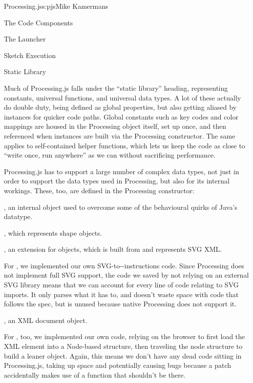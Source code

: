 \begin{aosachapter}{Processing.js}{s:pjs}{Mike Kamermans}
\begin{aosasect1}{The Code Components}
\begin{aosasect2}{The Launcher}
\begin{aosasect3}{Sketch Execution}
\end{aosasect3}

\end{aosasect2}

\begin{aosasect2}{Static Library}

Much of Processing.js falls under the ``static library'' heading,
representing constants, universal functions, and universal data
types. A lot of these actually do double duty, being defined as global
properties, but also getting aliased by instances for quicker code
paths. Global constants such as key codes and color mappings are
housed in the Processing object itself, set up once, and then
referenced when instances are built via the Processing
constructor. The same applies to self-contained helper functions,
which lets us keep the code as close to ``write once, run anywhere'' as
we can without sacrificing performance.

Processing.js has to support a large number of complex data types, not
just in order to support the data types used in Processing, but also
for its internal workings. These, too, are defined in the Processing
constructor:

\begin{aosadescription}

\item{}, an internal object used to overcome some of the
  behavioural quirks of Java's  datatype.

\item{}, which represents shape objects.

\item{}, an extension for  objects, which is built from and
  represents SVG XML.

For , we implemented our own
SVG-to--instructions code. Since
Processing does not implement full SVG support, the code we saved by
not relying on an external SVG library means that we can account for
every line of code relating to SVG imports. It only parses what it has
to, and doesn't waste space with code that follows the spec, but is
unused because native Processing does not support it.

\item{}, an XML document object.

For , too, we implemented our own code, relying on the
browser to first load the XML element into a Node-based structure,
then traveling the node structure to build a leaner object. Again,
this means we don't have any dead code sitting in Processing.js,
taking up space and potentially causing bugs because a patch
accidentally makes use of a function that shouldn't be there.


\end{aosadescription}
\end{aosasect2}
\end{aosasect1}
\end{aosachapter}

